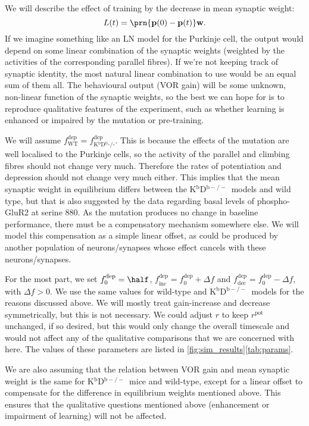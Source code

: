 \documentclass[10pt]{article}
\newcommand{\pr}{\mathbf{p}}
\newcommand{\w}{\mathbf{w}}
\newcommand{\pot}{^{\text{pot}}}
\newcommand{\dep}{^{\text{dep}}}
\newcommand{\norm}{_0}
\newcommand{\inc}{_{\text{inc}}}
\newcommand{\dec}{_{\text{dec}}}
\newcommand{\wt}{_{\text{WT}}}
\newcommand{\ko}{_{\text{K$^\mathrm{b}$D$^\mathrm{b}$-/-}}}
\newcommand{\KO}{K$^\mathrm{b}$D$^{\mathrm{b}-/-}$}
\begin{document}
We will describe the effect of training by the decrease in mean synaptic weight:
%
\begin{equation}\label{eq:learning}
  L(t) = \prn{\pr(0)-\pr(t)}\w.
\end{equation}
%
If we imagine something like an LN model for the Purkinje cell, the output would depend on some linear combination of the synaptic weights (weighted by the activities of the corresponding parallel fibres).
If we're not keeping track of synaptic identity, the most natural linear combination to use would be an equal sum of them all.
The behavioural output (VOR gain) will be some unknown, non-linear function of the synaptic weights, so the best we can hope for is to reproduce qualitative features of the experiment, such as whether learning is enhanced or impaired by the mutation or pre-training.

We will assume $f\dep\wt=f\dep\ko$.
This is because the effects of the mutation are well localised to the Purkinje cells, so the activity of the parallel and climbing fibres should not change very much.
Therefore the rates of potentiation and depression should not change very much either.
This implies that the mean synaptic weight in equilibrium differs between the \KO\ models and wild type, but that is also suggested by the data regarding basal levels of phospho-GluR2 at serine 880.
As the mutation produces no change in baseline performance, there must be a compensatory mechanism somewhere else.
We will model this compensation as a simple linear offset, as could be produced by another population of neurons/synapses whose effect cancels with these neurons/synapses.

For the most part, we set $f\dep\norm=\half$, $f\dep\inc=f\dep\norm+\Delta f$ and $f\dep\dec=f\dep\norm-\Delta f$, with $\Delta f>0$.
We use the same values for wild-type and \KO\ models for the reasons discussed above.
We will mostly treat gain-increase and decrease symmetrically, but this is not necessary.
We could adjust $r$ to keep $r\pot$ unchanged, if so desired, but this would only change the overall timescale and would not affect any of the qualitative comparisons that we are concerned with here.
The values of these parameters are listed in \autoref{fig:sim_results}\ref{tab:params}.

We are also assuming that the relation between VOR gain and mean synaptic weight is the same for \KO\ mice and wild-type, except for a linear offset to compensate for the difference in equilibrium weights mentioned above.
This ensures that the qualitative questions mentioned above (enhancement or impairment of learning) will not be affected.
\end{document}
